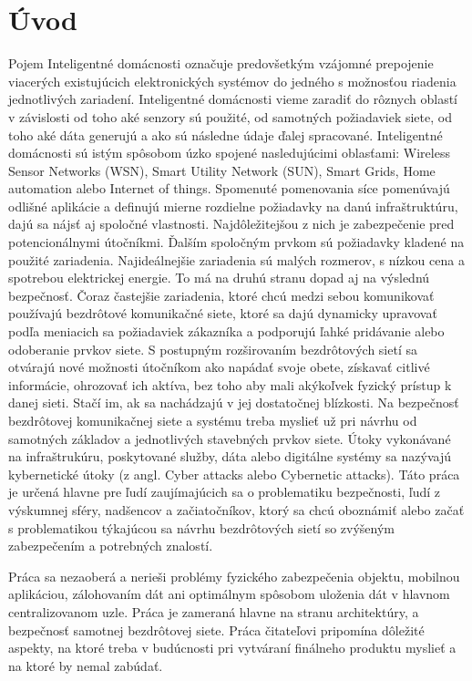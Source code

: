 \documentclass[12pt,a4wide,oneside,openright]{report}
\begin{document}
\chapter{Úvod}
Pojem Inteligentné domácnosti označuje predovšetkým vzájomné prepojenie viacerých existujúcich elektronických systémov do jedného s možnosťou riadenia jednotlivých zariadení.
Inteligentné domácnosti vieme zaradiť do rôznych oblastí v závislosti od toho aké senzory sú použité, od samotných požiadaviek siete, od toho aké dáta generujú a ako sú následne údaje ďalej spracované. Inteligentné domácnosti sú istým spôsobom úzko spojené nasledujúcimi oblasťami: Wireless Sensor Networks (WSN), Smart Utility Network (SUN), Smart Grids, Home automation alebo Internet of things. Spomenuté pomenovania síce pomenúvajú odlišné aplikácie a definujú mierne rozdielne požiadavky na danú infraštruktúru, dajú sa nájsť aj spoločné vlastnosti. Najdôležitejšou z nich je zabezpečenie pred potencionálnymi útočníkmi.
Ďalším spoločným prvkom sú požiadavky kladené na použité zariadenia. Najideálnejšie zariadenia sú malých rozmerov, s nízkou cena a spotrebou elektrickej energie. To má na druhú stranu dopad aj na výslednú bezpečnosť.
Čoraz častejšie zariadenia, ktoré chcú medzi sebou komunikovať používajú bezdrôtové komunikačné siete, ktoré sa dajú dynamicky upravovať podľa meniacich sa požiadaviek zákazníka a podporujú ľahké pridávanie alebo odoberanie prvkov siete.
S postupným rozširovaním bezdrôtových sietí sa otvárajú nové možnosti útočníkom ako napádať svoje obete, získavať citlivé informácie, ohrozovať ich aktíva, bez toho aby mali akýkoľvek fyzický prístup k danej sieti. Stačí im, ak sa nachádzajú v jej dostatočnej blízkosti.
Na bezpečnosť bezdrôtovej komunikačnej siete a systému treba myslieť už pri návrhu od samotných základov a jednotlivých stavebných prvkov siete.
Útoky vykonávané na infraštrukúru, poskytované služby, dáta alebo digitálne systémy sa nazývajú kybernetické útoky (z angl. Cyber attacks alebo Cybernetic attacks).
Táto práca je určená hlavne pre ľudí zaujímajúcich sa o problematiku bezpečnosti, ľudí z výskumnej sféry, nadšencov a začiatočníkov, ktorý sa chcú oboznámiť alebo začať s problematikou týkajúcou sa návrhu bezdrôtových sietí so zvýšeným zabezpečením a potrebných znalostí.

Práca sa nezaoberá a nerieši problémy fyzického zabezpečenia objektu, mobilnou aplikáciou, zálohovaním dát ani optimálnym spôsobom uloženia dát v hlavnom centralizovanom uzle. Práca je zameraná hlavne na stranu architektúry, a bezpečnosť samotnej bezdrôtovej siete. Práca čitateľovi pripomína dôležité aspekty, na ktoré treba v budúcnosti pri vytváraní finálneho produktu myslieť a na ktoré by nemal zabúdať.
\end{document}
